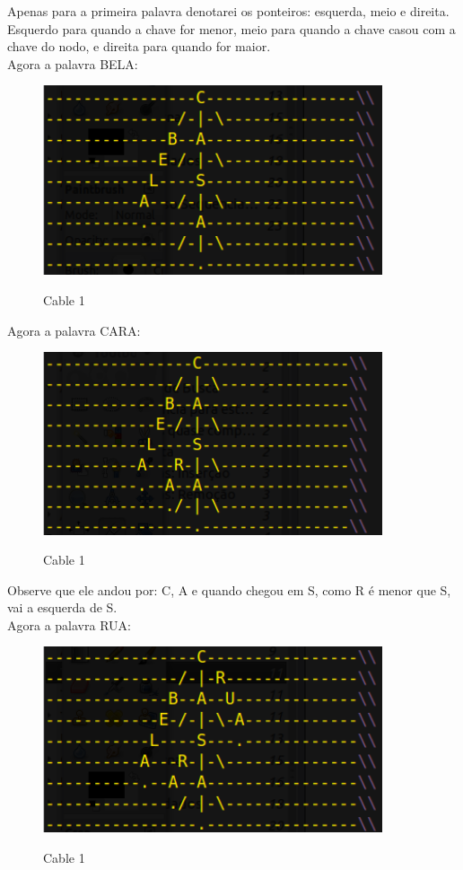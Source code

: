 \documentclass{article}
\begin{document}
Apenas para a primeira palavra denotarei os ponteiros: esquerda, meio e direita. Esquerdo para quando
a chave for menor, meio para quando a chave casou com a chave do nodo, e direita para quando for
maior.\\

Agora a palavra BELA:\\
\begin{figure}[h]
    \center
    \includegraphics[width=10cm]{imagens/ternaria2.png}
    \label{cable}
    \caption{Cable 1}
\end{figure}

Agora a palavra CARA:\\
\begin{figure}[h]
    \center
    \includegraphics[width=10cm]{imagens/ternaria3.png}
    \label{cable}
    \caption{Cable 1}
\end{figure}

Observe que ele andou por: C, A e quando chegou em S, como R é menor que S, vai a esquerda de S.\\

Agora a palavra RUA:\\
\begin{figure}[h]
    \center
    \includegraphics[width=10cm]{imagens/ternaria4.png}
    \label{cable}
    \caption{Cable 1}
\end{figure}
\end{document}
